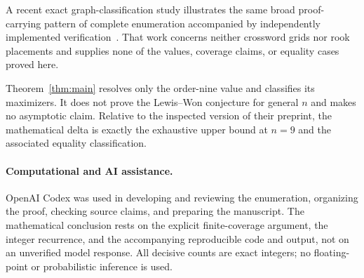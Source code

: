 \documentclass[11pt]{article}
\begin{document}
A recent exact graph-classification study illustrates the same broad
proof-carrying pattern of complete enumeration accompanied by independently
implemented verification~\cite{Zeng2026SSRN7374858}.  That work concerns
neither crossword grids nor rook placements and supplies none of the values,
coverage claims, or equality cases proved here.

Theorem~\ref{thm:main} resolves only the order-nine value and classifies its
maximizers.  It does not prove the Lewis--Won conjecture for general $n$ and
makes no asymptotic claim.  Relative to the inspected version of their
preprint, the mathematical delta is exactly the exhaustive upper bound at
$n=9$ and the associated equality classification.

\paragraph{Computational and AI assistance.}
OpenAI Codex was used in developing and reviewing the enumeration, organizing
the proof, checking source claims, and preparing the manuscript.  The
mathematical conclusion rests on the explicit finite-coverage argument, the
integer recurrence, and the accompanying reproducible code and output, not on
an unverified model response.  All decisive counts are exact integers; no
floating-point or probabilistic inference is used.



\end{document}
